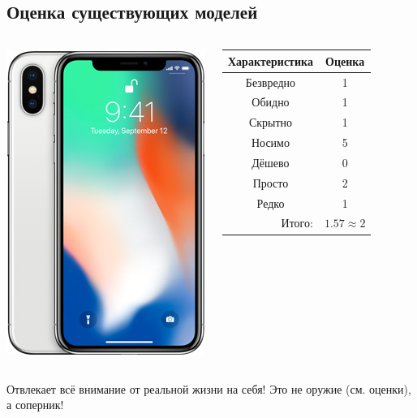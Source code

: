 \subsection{Оценка существующих моделей}

\begin{frame}  %
    \begin{columns}
            \begin{center}
                \includegraphics[height=.8\textheight]{fig/iphoneX}
            \end{center}
            
            \begin{center}
                \begin{tabular}{c|c}
                    \hline\hline
                    Характеристика              & Оценка\\ \hline\hline
                    Безвредно                   & 1 \\
                    Обидно                      & 1 \\
                    Скрытно                     & 1 \\
                    Носимо                      & 5 \\
                    Дёшево                      & 0 \\
                    Просто                      & 2 \\ 
                    Редко                       & 1 \\ \hline
                    \multicolumn{1}{r|}{Итого:} & $1.57\approx 2$ \\
                \end{tabular}
            \end{center}
    \end{columns}    
    
    Отвлекает \alert{всё} внимание от \alert{реальной жизни} на себя! Это \alert{не оружие} (см. оценки), а \alert{соперник}!
\end{frame}

